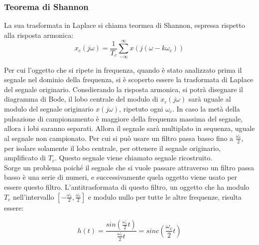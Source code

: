 \documentclass{article}
\numberwithin{equation}{subsection}
\begin{document}
\subsubsection{Teorema di Shannon}

La sua trasformata in Laplace si chiama teormea di Shannon, espressa rispetto alla risposta armonica:
\begin{equation}
    x_c(j\omega)=\displaystyle\frac{1}{T_c}\sum_{-\infty}^{\infty}x(j(\omega-k\omega_c))
\end{equation}

Per cui l'oggetto che si ripete in frequenza, quando è stato analizzato prima il segnale nel dominio della frequenza, si è scoperto essere la trasformata di Laplace del 
segnale originario. Consdierando la risposta armonica, si potrà disegnare il diagramma di Bode, il lobo centrale del modulo di $x_c(j\omega)$ sarà uguale al modulo del 
segnale originario $x(j\omega)$, ripetuto ogni $\omega_c$. In caso la metà della pulsazione di campionamento è maggiore della frequenza massima del segnale, allora i lobi 
saranno separati. Allora il segnale sarà multiplato in sequenza, uguale al segnale non campionato. Per cui si può usare un filtro passa basso fino a $\displaystyle\frac{\omega_c}{2}$, 
per isolare solamente il lobo centrale, per ottenere il segnale originario, amplificato di $T_c$. Questo segnale viene chiamato segnale ricostruito. \\

Sorge un problema poiché il segnale che si vuole passare attraverso un filtro passa basso è una serie di numeri, e successivamente quela oggetto viene usato per essere 
questo filtro. L'antitrasformata di questo filtro, un oggetto che ha modulo $T_c$ nell'intervallo $[-\displaystyle\frac{\omega_c}{2},\frac{\omega_c}{2}]$ e modulo 
nullo per tutte le altre frequenze, risulta essere: 

\begin{equation}
    h(t)=\displaystyle\frac{sin\left(\displaystyle\frac{\omega_c}{2}t\right)}{\displaystyle\frac{\omega_c}{2}t}=sinc\left(\frac{\omega_c}{2}t\right)
\end{equation}
\end{document}
